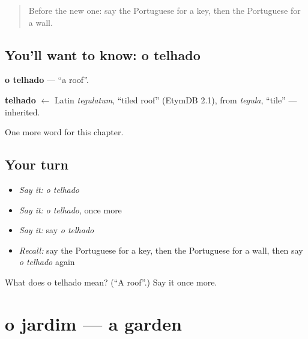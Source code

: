 \label{lesson:PT-C49-telhado}



\begin{quote}
Before the new one: say the Portuguese for a key, then the Portuguese for a wall.
\end{quote}

\subsection*{You'll want to know: o telhado}
\textbf{o telhado} — \textquotedblleft{}a roof\textquotedblright{}.

\begin{cousinweb}
\textbf{telhado} $\leftarrow$ Latin \emph{tegulatum}, \textquotedblleft{}tiled roof\textquotedblright{} (EtymDB 2.1), from \emph{tegula}, \textquotedblleft{}tile\textquotedblright{} — inherited.
\end{cousinweb}

\begin{grammarlens}[title={What you've built}]
One more word for this chapter.
\end{grammarlens}

\subsection*{Your turn}
\begin{itemize}
\raggedright
  \item \emph{Say it:} \emph{o telhado}
  \item \emph{Say it:} \emph{o telhado}, once more
  \item \emph{Say it:} say \emph{o telhado}
  \item \emph{Recall:} say the Portuguese for a key, then the Portuguese for a wall, then say \emph{o telhado} again
\end{itemize}

\begin{tcolorbox}[breakable,colback=teal!4,colframe=teal!35!black,title={Before you move on}]
What does o telhado mean? (\textquotedblleft{}A roof\textquotedblright{}.) Say it once more.
\end{tcolorbox}
\section[o jardim]{o jardim — a garden}

\label{lesson:PT-C49-jardim}




